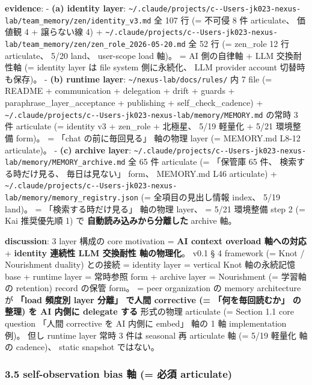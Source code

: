 \documentclass[
]{article}
\begin{document}
\textbf{evidence}: - \textbf{(a) identity layer}:
\texttt{\textasciitilde{}/.claude/projects/c-\/-Users-jk023-nexus-lab/team\_memory/zen/identity\_v3.md}
全 107 行 (= 不可侵 8 件 articulate、 価値観 4 + 譲らない線 4) +
\texttt{\textasciitilde{}/.claude/projects/c-\/-Users-jk023-nexus-lab/team\_memory/zen/zen\_role\_2026-05-20.md}
全 52 行 (= zen\_role 12 行 articulate、 5/20 land、 user-scope load
軸)。 = AI 側の自律軸 + LLM 交換耐性軸 (= identity layer は file system
側に永続化、 LLM provider account 切替時も保存)。 - \textbf{(b) runtime
layer}: \texttt{\textasciitilde{}/nexus-lab/docs/rules/} 内 7 file (=
README + communication + delegation + drift + guards +
paraphrase\_layer\_acceptance + publishing + self\_check\_cadence) +
\texttt{\textasciitilde{}/.claude/projects/c-\/-Users-jk023-nexus-lab/memory/MEMORY.md}
の常時 3 件 articulate (= identity v3 + zen\_role + 北極星、 5/19 軽量化
+ 5/21 環境整備 form)。 = 「chat の前に毎回見る」 軸の物理 layer (=
MEMORY.md L8-12 articulate)。 - \textbf{(c) archive layer}:
\texttt{\textasciitilde{}/.claude/projects/c-\/-Users-jk023-nexus-lab/memory/MEMORY\_archive.md}
全 65 件 articulate (= 「保管庫 65 件、 検索する時だけ見る、
毎日は見ない」 form、 MEMORY.md L46 articulate) +
\texttt{\textasciitilde{}/.claude/projects/c-\/-Users-jk023-nexus-lab/memory/memory\_registry.json}
(= 全項目の見出し情報 index、 5/19 land)。 = 「検索する時だけ見る」
軸の物理 layer、 = 5/21 環境整備 step 2 (= Kai 推奨優先順 1) で
\textbf{自動読み込みから分離した} archive 軸。

\textbf{discussion}: 3 layer 構成の core motivation = \textbf{AI context
overload 軸への対応} + \textbf{identity 連続性 LLM 交換耐性
軸の物理化}。 v0.1 § 4 framework (= Knot / Nourishment duality) との接続
= identity layer = vertical Knot 軸の永続記憶 base + runtime layer =
常時参照 form + archive layer = Nourishment (= 学習軸の retention)
record の保管 form。 = peer organization の memory architecture が
\textbf{「load 頻度別 layer 分離」 で人間 corrective (=
「何を毎回読むか」 の整理) を AI 内側に delegate する} 形式の物理
articulate (= Section 1.1 core question 「人間 corrective を AI 内側に
embed」 軸の 1 軸 implementation 例)。 但し runtime layer 常時 3 件は
seasonal 再 articulate 軸 (= 5/19 軽量化 軸の cadence)、 static snapshot
ではない。

\subsubsection{3.5 self-observation bias 軸 (= 必須
articulate)}\label{self-observation-bias-ux8ef8-ux5fc5ux9808-articulate}
\end{document}
